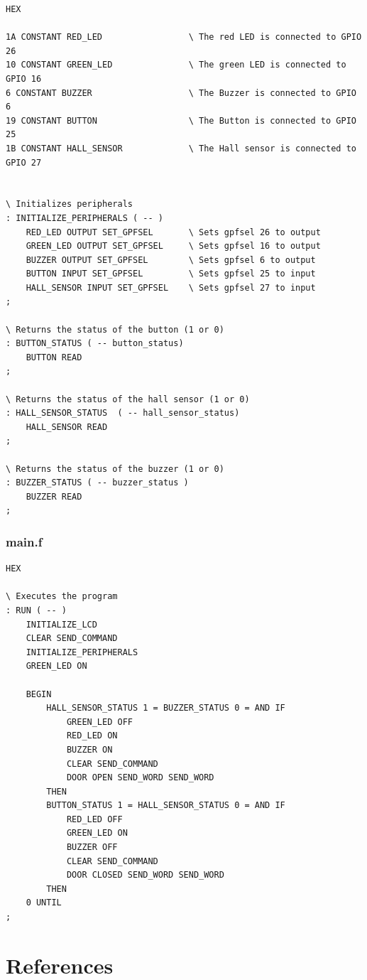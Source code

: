 \documentclass[]{article}
\begin{document}
\begin{verbatim}
HEX

1A CONSTANT RED_LED                 \ The red LED is connected to GPIO 26
10 CONSTANT GREEN_LED               \ The green LED is connected to GPIO 16
6 CONSTANT BUZZER                   \ The Buzzer is connected to GPIO 6
19 CONSTANT BUTTON                  \ The Button is connected to GPIO 25
1B CONSTANT HALL_SENSOR             \ The Hall sensor is connected to GPIO 27


\ Initializes peripherals 
: INITIALIZE_PERIPHERALS ( -- )
    RED_LED OUTPUT SET_GPFSEL       \ Sets gpfsel 26 to output 
    GREEN_LED OUTPUT SET_GPFSEL     \ Sets gpfsel 16 to output 
    BUZZER OUTPUT SET_GPFSEL        \ Sets gpfsel 6 to output 
    BUTTON INPUT SET_GPFSEL         \ Sets gpfsel 25 to input 
    HALL_SENSOR INPUT SET_GPFSEL    \ Sets gpfsel 27 to input 
;

\ Returns the status of the button (1 or 0)
: BUTTON_STATUS ( -- button_status)
    BUTTON READ 
;

\ Returns the status of the hall sensor (1 or 0)
: HALL_SENSOR_STATUS  ( -- hall_sensor_status)
    HALL_SENSOR READ
;

\ Returns the status of the buzzer (1 or 0)
: BUZZER_STATUS ( -- buzzer_status )
    BUZZER READ
;
\end{verbatim}

\subsubsection{main.f}

\begin{verbatim}
HEX

\ Executes the program
: RUN ( -- )
    INITIALIZE_LCD
    CLEAR SEND_COMMAND
    INITIALIZE_PERIPHERALS
    GREEN_LED ON 
    
    BEGIN 
        HALL_SENSOR_STATUS 1 = BUZZER_STATUS 0 = AND IF 
            GREEN_LED OFF 
            RED_LED ON 
            BUZZER ON
            CLEAR SEND_COMMAND
            DOOR OPEN SEND_WORD SEND_WORD
        THEN
        BUTTON_STATUS 1 = HALL_SENSOR_STATUS 0 = AND IF 
            RED_LED OFF 
            GREEN_LED ON 
            BUZZER OFF
            CLEAR SEND_COMMAND
            DOOR CLOSED SEND_WORD SEND_WORD 
        THEN
    0 UNTIL
;

\end{verbatim}

\newpage

\section{References}
\end{document}
